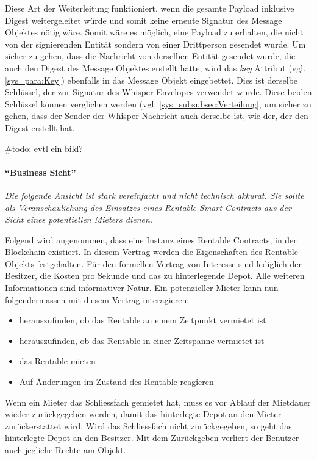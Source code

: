 Diese Art der Weiterleitung funktioniert, wenn die gesamte Payload inklusive Digest weitergeleitet würde und somit keine erneute Signatur des Message Objektes nötig wäre. Somit wäre es möglich, eine Payload zu erhalten, die nicht von der signierenden Entität sondern von einer Drittperson gesendet wurde. Um sicher zu gehen, dass die Nachricht von derselben Entität gesendet wurde, die auch den Digest des Message Objektes erstellt hatte, wird das \emph{key} Attribut (vgl. \ref{sys_para:Key}) ebenfalls in das Message Objekt eingebettet. Dies ist derselbe Schlüssel, der zur Signatur des Whisper Envelopes verwendet wurde. Diese beiden Schlüssel können verglichen werden (vgl. \ref{sys_subsubsec:Verteilung}, um sicher zu gehen, dass der Sender der Whisper Nachricht auch derselbe ist, wie der, der den Digest erstellt hat.

\#todo: evtl ein bild?

\paragraph{``Business Sicht''}
\emph{Die folgende Ansicht ist stark vereinfacht und nicht technisch akkurat. Sie sollte als Veranschaulichung des Einsatzes eines Rentable Smart Contracts aus der Sicht eines potentiellen Mieters dienen.}

Folgend wird angenommen, dass eine Instanz eines Rentable Contracts, in der Blockchain existiert. In diesem Vertrag werden die Eigenschaften des Rentable Objekts festgehalten. Für den formellen Vertrag von Interesse sind lediglich der Besitzer, die Kosten pro Sekunde und das zu hinterlegende Depot. Alle weiteren Informationen sind informativer Natur. Ein potenzieller Mieter kann nun folgendermassen mit diesem Vertrag interagieren:

\begin{itemize}
    \item herauszufinden, ob das Rentable an einem Zeitpunkt vermietet ist
    \item herauszufinden, ob das Rentable in einer Zeitspanne vermietet ist
    \item das Rentable mieten
    \item Auf Änderungen im Zustand des Rentable reagieren
\end{itemize}

Wenn ein Mieter das Schliessfach gemietet hat, muss es vor Ablauf der Mietdauer wieder zurückgegeben werden, damit das hinterlegte Depot an den Mieter zurückerstattet wird. Wird das Schliessfach nicht zurückgegeben, so geht das hinterlegte Depot an den Besitzer. Mit dem Zurückgeben verliert der Benutzer auch jegliche Rechte am Objekt.

